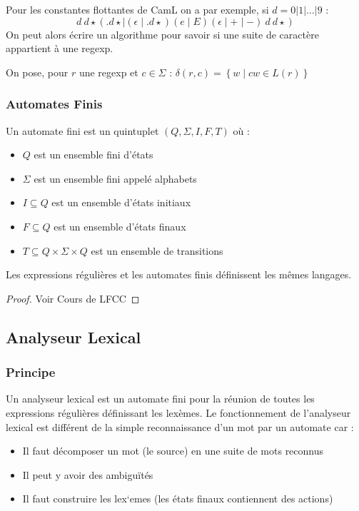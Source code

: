 \documentclass{cours}
\begin{document}
Pour les constantes flottantes de CamL on a par exemple, si $d = 0 | 1 | \ldots | 9$ :
\[
    d\ d\star(.d\star \mid (\epsilon \mid .d\star)(e \mid E)(\epsilon \mid + \mid -)\ d\ d\star)  
\]
On peut alors écrire un algorithme pour savoir si une suite de caractère appartient à une regexp.
\begin{definition}
    On pose, pour $r$ une regexp et $c \in \Sigma$ : $\delta(r, c) = \left\{w \mid cw \in L(r)\right\}$
\end{definition}

\subsubsection{Automates Finis}
\begin{definition}[Syntaxe]
    Un automate fini est un quintuplet $(Q, \Sigma, I, F, T)$ où :
    \begin{itemize}
        \item $Q$ est un ensemble fini d'états
        \item $\Sigma$ est un ensemble fini appelé alphabets
        \item $I \subseteq Q$ est un ensemble d'états initiaux
        \item $F \subseteq Q$ est un ensemble d'états finaux
        \item $T \subseteq Q \times \Sigma \times Q$ est un ensemble de transitions
    \end{itemize}
\end{definition}

\begin{theorem}[De Kleene]
    Les expressions régulières et les automates finis définissent les mêmes langages. 
\end{theorem}
\begin{proof}
    Voir Cours de LFCC
\end{proof}

\subsection{Analyseur Lexical}

\subsubsection{Principe}

Un analyseur lexical est un automate fini pour la réunion de toutes les expressions régulières définissant les lexèmes.
Le fonctionnement de l'analyseur lexical est différent de la simple reconnaissance d'un mot par un automate car : 
\begin{itemize}
    \item Il faut décomposer un mot (le source) en une suite de mots reconnus
    \item Il peut y avoir des ambiguïtés
    \item Il faut construire les lex`emes (les états finaux contiennent des actions)
\end{itemize}
\end{document}
